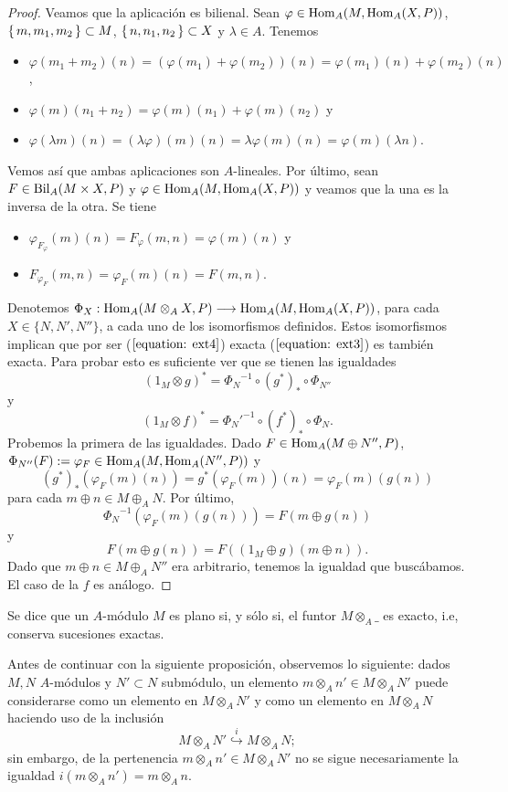\documentclass[../main.tex]{subfiles}
\begin{document}
\begin{proof}
	Veamos que la aplicación es bilienal. Sean $\varphi\in\operatorname{Hom}_A(M,\operatorname{Hom}_A(X,P))$, $\set{m,m_1,m_2}\subset M$, $\set{n,n_1,n_2}\subset X$ y $\lambda\in A$. Tenemos
	\begin{itemize}
		\item $\varphi(m_1+m_2)(n)=(\varphi(m_1)+\varphi(m_2))(n)=\varphi(m_1)(n)+\varphi(m_2)(n)$,
		\item $\varphi(m)(n_1+n_2)=\varphi(m)(n_1)+\varphi(m)(n_2)$ y
		\item $\varphi(\lambda m)(n)=(\lambda\varphi)(m)(n)=\lambda \varphi(m)(n)=\varphi(m)(\lambda n)$.
	\end{itemize}
	Vemos así que ambas aplicaciones son $A$-lineales. Por último, sean $F\in\operatorname{Bil}_A(M\times X,P)$ y $\varphi\in\operatorname{Hom}_A(M,\operatorname{Hom}_A(X,P))$ y veamos que la una es la inversa de la otra. Se tiene
	\begin{itemize}
		\item $\varphi_{F_\varphi}(m)(n)=F_\varphi(m,n)=\varphi(m)(n)$ y
		\item $F_{\varphi_F}(m,n)=\varphi_F(m)(n)=F(m,n).$
	\end{itemize}
	
	Denotemos $\Phi_X:\operatorname{Hom}_A(M\otimes_A X,P)\longrightarrow\operatorname{Hom}_A(M,\operatorname{Hom}_A(X,P))$, para cada $X\in\{N,N',N''\}$, a cada uno de los isomorfismos definidos.
	Estos isomorfismos implican que por ser ($\ref{equation: ext4}$) exacta ($\ref{equation: ext3}$) es también exacta. Para probar esto es suficiente ver que se tienen las igualdades
	$$(1_M\otimes g)^*={\Phi_N}^{-1}\circ(g^*)_*\circ\Phi_{N''}$$
	y
	$$(1_M\otimes f)^*={\Phi_N'}^{-1}\circ(f^*)_*\circ\Phi_{N}.$$
	Probemos la primera de las igualdades. Dado $F\in\operatorname{Hom}_A(M\oplus N'',P)$, $\Phi_{N''}(F):=\varphi_F\in\operatorname{Hom}_A(M,\operatorname{Hom}_A(N'',P))$ y $$(g^*)_*(\varphi_F(m)(n))=g^*(\varphi_F(m))(n)=\varphi_F(m)(g(n))$$
	para cada $m\oplus n\in M\oplus_A N$. Por último,
	$${\Phi_N}^{-1}(\varphi_F(m)(g(n)))=F(m\oplus g(n))$$
	y
	$$F(m\oplus g(n))=F((1_M\oplus g)(m\oplus n)).$$
	Dado que $m\oplus n\in M\oplus_A N''$ era arbitrario, tenemos la igualdad que buscábamos.
	El caso de la $f$ es análogo.
\end{proof}

\begin{definition}
	Se dice que un $A$-módulo $M$ es plano si, y sólo si, el funtor $M\otimes_A \_$ es exacto, i.e, conserva sucesiones exactas.
\end{definition}

Antes de continuar con la siguiente proposición, observemos lo siguiente: dados $M,N$ $A$-módulos y $N'\subset N$ submódulo, un elemento $m\otimes_A n'\in M\otimes_A N'$ puede considerarse como un elemento en $M\otimes_A N'$ y como un elemento en $M\otimes_A N$ haciendo uso de la inclusión $$M\otimes_A N'\overset{i}{\hookrightarrow}M\otimes_A N;$$
sin embargo, de la pertenencia $m\otimes_A n'\in M\otimes_A N'$ no se sigue necesariamente la igualdad $i(m\otimes_A n')=m\otimes_A n$.
\end{document}
